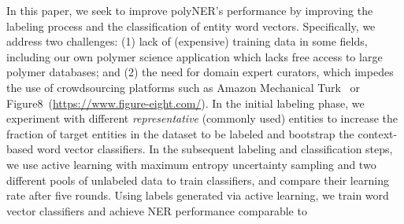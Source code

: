 In this paper, we seek to improve polyNER's performance by improving the labeling process and the classification of entity word vectors. 
Specifically, we address two challenges: 
(1) lack of (expensive) training data in some fields, including our own polymer science application which lacks free access to large polymer databases; and 
(2) the need for domain expert curators, which impedes the use of crowdsourcing platforms such as Amazon Mechanical Turk~\cite{buhrmester2011amazon} or Figure8~(\url{https://www.figure-eight.com/}).
In the initial labeling phase, 
we experiment with different \textit{representative} (commonly used) entities to increase the fraction of target entities in the dataset to be labeled and bootstrap the context-based word vector classifiers. %
In the subsequent labeling and classification steps,
we use active learning with maximum entropy uncertainty sampling and two different pools of unlabeled data to train classifiers, and compare their learning rate after five rounds. 
Using labels generated via active learning, we train word vector classifiers and achieve NER performance comparable to 
